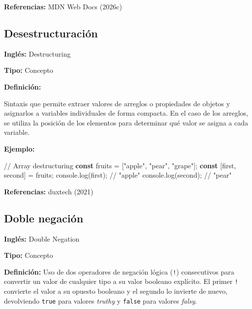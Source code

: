 \documentclass[
  letterpaper,
  DIV=11,
  numbers=noendperiod]{scrreprt}
\newenvironment{Shaded}{\begin{snugshade}}{\end{snugshade}}
\newcommand{\BuiltInTok}[1]{\textcolor[rgb]{0.00,0.23,0.31}{#1}}
\newcommand{\CommentTok}[1]{\textcolor[rgb]{0.37,0.37,0.37}{#1}}
\newcommand{\FunctionTok}[1]{\textcolor[rgb]{0.28,0.35,0.67}{#1}}
\newcommand{\KeywordTok}[1]{\textcolor[rgb]{0.00,0.23,0.31}{\textbf{#1}}}
\newcommand{\NormalTok}[1]{\textcolor[rgb]{0.00,0.23,0.31}{#1}}
\newcommand{\OperatorTok}[1]{\textcolor[rgb]{0.37,0.37,0.37}{#1}}
\newcommand{\StringTok}[1]{\textcolor[rgb]{0.13,0.47,0.30}{#1}}
\let\oldsubsection\subsection
\renewcommand{\subsection}{\phantomsection\oldsubsection}
\begin{document}
\textbf{Referencias:} MDN Web Docs (2026c)

\subsection*{Desestructuración}\label{glos-desestructuraciuxf3n}

\textbf{Inglés:} Destructuring

\textbf{Tipo:} Concepto

\textbf{Definición:}

Sintaxis que permite extraer valores de arreglos o propiedades de
objetos y asignarlos a variables individuales de forma compacta. En el
caso de los arreglos, se utiliza la posición de los elementos para
determinar qué valor se asigna a cada variable.

\textbf{Ejemplo:}

\begin{Shaded}
\begin{Highlighting}[]
\CommentTok{// Array destructuring}
\KeywordTok{const}\NormalTok{ fruits }\OperatorTok{=}\NormalTok{ [}\StringTok{"apple"}\OperatorTok{,} \StringTok{"pear"}\OperatorTok{,} \StringTok{"grape"}\NormalTok{]}\OperatorTok{;}
\KeywordTok{const}\NormalTok{ [first}\OperatorTok{,}\NormalTok{ second] }\OperatorTok{=}\NormalTok{ fruits}\OperatorTok{;}
\BuiltInTok{console}\OperatorTok{.}\FunctionTok{log}\NormalTok{(first)}\OperatorTok{;}  \CommentTok{// "apple"}
\BuiltInTok{console}\OperatorTok{.}\FunctionTok{log}\NormalTok{(second)}\OperatorTok{;} \CommentTok{// "pear"}
\end{Highlighting}
\end{Shaded}

\textbf{Referencias:} duxtech (2021)

\subsection*{Doble negación}\label{glos-doble-negacion}

\textbf{Inglés:} Double Negation

\textbf{Tipo:} Concepto

\textbf{Definición:} Uso de dos operadores de negación lógica
(\texttt{!}) consecutivos para convertir un valor de cualquier tipo a su
valor booleano explícito. El primer \texttt{!} convierte el valor a su
opuesto booleano y el segundo lo invierte de nuevo, devolviendo
\texttt{true} para valores \emph{truthy} y \texttt{false} para valores
\emph{falsy}.
\end{document}
